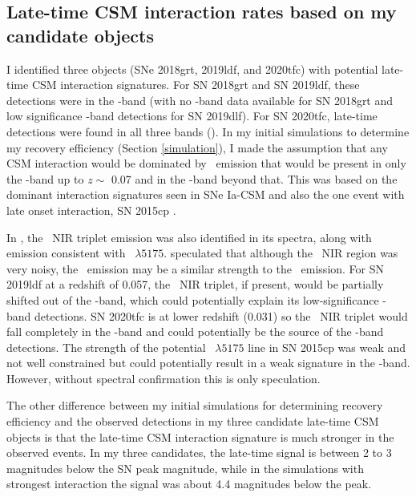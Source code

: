 \documentclass[a4paper,oneside,12pt, class=Latex/Classes/PhDthesisPSnPDF, crop=false]{standalone}
\begin{document}
\subsection{Late-time CSM interaction rates based on my candidate objects}
\label{rates_csm}

 I identified three objects (SNe 2018grt, 2019ldf, and 2020tfc) with potential late-time CSM interaction signatures. For SN 2018grt and SN 2019ldf, these detections were in the \ztfr-band (with no \ztfi-band data available for SN 2018grt and low significance \ztfi-band detections for SN 2019dlf). For SN 2020tfc, late-time detections were found in all three bands (\ztfg\ztfr\ztfi). In my initial simulations to determine my recovery efficiency (Section \ref{simulation}), I made the assumption that any CSM interaction would be dominated by \Halpha~emission that would be present in only the \ztfr-band up to $z \sim$ 0.07 and in the \ztfi-band beyond that. This was based on the dominant interaction signatures seen in SNe Ia-CSM and also the one event with late onset interaction, SN 2015cp \citep{2015cp}. 

In \citet{2015cp}, the \CaII\ NIR triplet emission was also identified in its spectra, along with emission consistent with \MgI~$\lambda5175$. \cite{2018ApJ...868...21H} speculated that although the \CaII\ NIR region was very noisy, the \CaII\ emission may be a similar strength to the \Halpha~emission. For SN 2019ldf at a redshift of 0.057, the \CaII\ NIR triplet, if present, would be partially shifted out of the \ztfi-band, which could potentially explain its low-significance \ztfi-band detections. SN 2020tfc is at lower redshift (0.031) so the \CaII\ NIR triplet would fall completely in the \ztfi-band and could potentially be the source of the \ztfi-band detections. The strength of the potential \MgI~$\lambda5175$ line in SN 2015cp was weak and not well constrained \citep{2015cp} but could potentially result in a weak signature in the \ztfg-band. However, without spectral confirmation this is only speculation.

The other difference between my initial simulations for determining recovery efficiency and the observed detections in my three candidate late-time CSM objects is that the late-time CSM interaction signature is much stronger in the observed events. In my three candidates, the late-time signal is between 2 to 3 magnitudes below the SN peak magnitude, while in the simulations with strongest interaction the signal was about 4.4 magnitudes below the peak.
\end{document}
